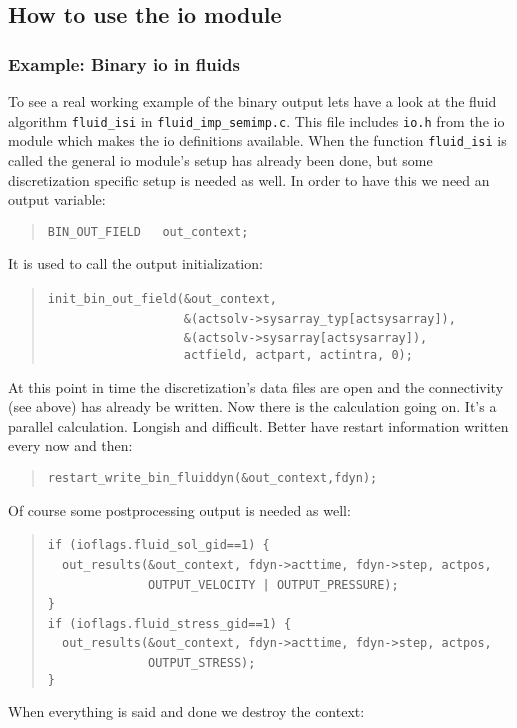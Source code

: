\subsection{How to use the io module}


\subsubsection{Example: Binary io in fluids}

To see a real working example of the binary output lets have a look
at the fluid algorithm \texttt{fluid{\_}isi} in \texttt{fluid{\_}imp{\_}semimp.c}.
This file includes \texttt{io.h} from the io module which makes the
io definitions available. When the function \texttt{fluid{\_}isi}
is called the general io module's setup has already been done, but
some discretization specific setup is needed as well. In order to
have this we need an output variable: 

\begin{quote}
\texttt{BIN{\_}OUT{\_}FIELD~~~out{\_}context; }
\end{quote}
It is used to call the output initialization: 

\begin{quote}
\texttt{init{\_}bin{\_}out{\_}field({\&}out{\_}context,~}~\\
 \texttt{~~~~~~~~~~~~~~~~~~~{\&}(actsolv->sysarray{\_}typ{[}actsysarray]),~}~\\
 \texttt{~~~~~~~~~~~~~~~~~~~{\&}(actsolv->sysarray{[}actsysarray]),~}~\\
 \texttt{~~~~~~~~~~~~~~~~~~~actfield,~actpart,~actintra,~0); }
\end{quote}
At this point in time the discretization's data files are open and
the connectivity (see above) has already be written. Now there is
the calculation going on. It's a parallel calculation. Longish and
difficult. Better have restart information written every now and then: 

\begin{quote}
\texttt{restart{\_}write{\_}bin{\_}fluiddyn({\&}out{\_}context,fdyn); }
\end{quote}
Of course some postprocessing output is needed as well: 

\begin{quote}
\texttt{if~(ioflags.fluid{\_}sol{\_}gid==1)~{\{}~}~\\
 \texttt{~~out{\_}results({\&}out{\_}context,~fdyn->acttime,~fdyn->step,~actpos,~}~\\
 \texttt{~~~~~~~~~~~~~~OUTPUT{\_}VELOCITY~|~OUTPUT{\_}PRESSURE);~}~\\
 \texttt{{\}}~}~\\
 \texttt{if~(ioflags.fluid{\_}stress{\_}gid==1)~{\{}~}~\\
 \texttt{~~out{\_}results({\&}out{\_}context,~fdyn->acttime,~fdyn->step,~actpos,~}~\\
 \texttt{~~~~~~~~~~~~~~OUTPUT{\_}STRESS);~}~\\
 \texttt{{\}} }
\end{quote}
When everything is said and done we destroy the context: 


